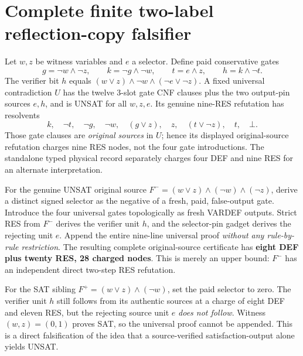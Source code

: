 \documentclass[11pt]{article}
\begin{document}
\section*{Complete finite two-label reflection-copy falsifier}
Let \(w,z\) be witness variables and \(e\) a selector. Define paid conservative gates
\[
g=\neg w\wedge\neg z,\qquad k=\neg g\wedge\neg w,\qquad t=e\wedge z,\qquad h=k\wedge\neg t.
\]
The verifier bit \(h\) equals \((w\vee z)\wedge\neg w\wedge(\neg e\vee\neg z)\). A fixed universal contradiction \(U\) has the twelve 3-slot gate CNF clauses plus the two output-pin sources \(e,h\), and is UNSAT for all \(w,z,e\). Its genuine nine-RES refutation has resolvents
\[
k,\quad\neg t,\quad\neg g,\quad\neg w,\quad(g\vee z),\quad z,\quad(t\vee\neg z),\quad t,\quad\bot.
\]
Those gate clauses are \emph{original sources} in \(U\); hence its displayed original-source refutation charges nine RES nodes, not the four gate introductions. The standalone typed physical record separately charges four DEF and nine RES for an alternate interpretation.

For the genuine UNSAT original source \(F^-=(w\vee z)\wedge(\neg w)\wedge(\neg z)\), derive a distinct signed selector as the negative of a fresh, paid, false-output gate. Introduce the four universal gates topologically as fresh VARDEF outputs. Strict RES from \(F^-\) derives the verifier unit \(h\), and the selector-pin gadget derives the rejecting unit \(e\). Append the entire nine-line universal proof \emph{without any rule-by-rule restriction}. The resulting complete original-source certificate has \textbf{eight DEF plus twenty RES, 28 charged nodes}. This is merely an upper bound: \(F^-\) has an independent direct two-step RES refutation.

For the SAT sibling \(F^+=(w\vee z)\wedge(\neg w)\), set the paid selector to zero. The verifier unit \(h\) still follows from its authentic sources at a charge of eight DEF and eleven RES, but the rejecting source unit \(e\) \emph{does not follow}. Witness \((w,z)=(0,1)\) proves SAT, so the universal proof cannot be appended. This is a direct falsification of the idea that a source-verified satisfaction-output alone yields UNSAT.
\end{document}
